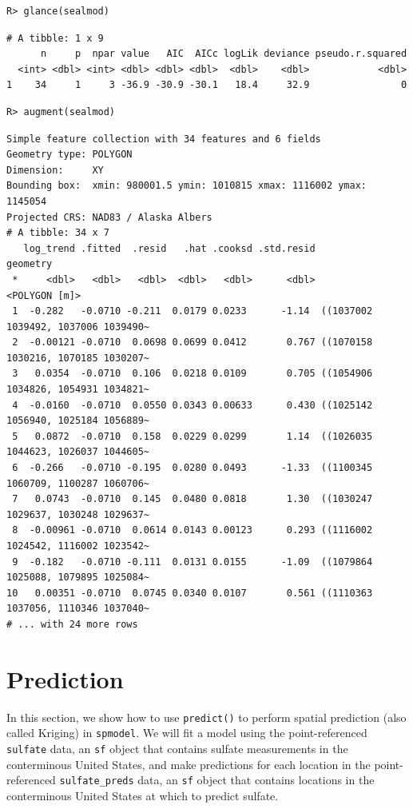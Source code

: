 \documentclass[10pt,letterpaper]{article}
\begin{document}
\begin{verbatim}
R> glance(sealmod)
\end{verbatim}

\begin{verbatim}
# A tibble: 1 x 9
      n     p  npar value   AIC  AICc logLik deviance pseudo.r.squared
  <int> <dbl> <int> <dbl> <dbl> <dbl>  <dbl>    <dbl>            <dbl>
1    34     1     3 -36.9 -30.9 -30.1   18.4     32.9                0
\end{verbatim}

\begin{verbatim}
R> augment(sealmod)
\end{verbatim}

\begin{verbatim}
Simple feature collection with 34 features and 6 fields
Geometry type: POLYGON
Dimension:     XY
Bounding box:  xmin: 980001.5 ymin: 1010815 xmax: 1116002 ymax: 1145054
Projected CRS: NAD83 / Alaska Albers
# A tibble: 34 x 7
   log_trend .fitted  .resid   .hat .cooksd .std.resid                            geometry
 *     <dbl>   <dbl>   <dbl>  <dbl>   <dbl>      <dbl>                       <POLYGON [m]>
 1  -0.282   -0.0710 -0.211  0.0179 0.0233      -1.14  ((1037002 1039492, 1037006 1039490~
 2  -0.00121 -0.0710  0.0698 0.0699 0.0412       0.767 ((1070158 1030216, 1070185 1030207~
 3   0.0354  -0.0710  0.106  0.0218 0.0109       0.705 ((1054906 1034826, 1054931 1034821~
 4  -0.0160  -0.0710  0.0550 0.0343 0.00633      0.430 ((1025142 1056940, 1025184 1056889~
 5   0.0872  -0.0710  0.158  0.0229 0.0299       1.14  ((1026035 1044623, 1026037 1044605~
 6  -0.266   -0.0710 -0.195  0.0280 0.0493      -1.33  ((1100345 1060709, 1100287 1060706~
 7   0.0743  -0.0710  0.145  0.0480 0.0818       1.30  ((1030247 1029637, 1030248 1029637~
 8  -0.00961 -0.0710  0.0614 0.0143 0.00123      0.293 ((1116002 1024542, 1116002 1023542~
 9  -0.182   -0.0710 -0.111  0.0131 0.0155      -1.09  ((1079864 1025088, 1079895 1025084~
10   0.00351 -0.0710  0.0745 0.0340 0.0107       0.561 ((1110363 1037056, 1110346 1037040~
# ... with 24 more rows
\end{verbatim}

\hypertarget{sec:prediction}{%
\section{Prediction}\label{sec:prediction}}

In this section, we show how to use \texttt{predict()} to perform
spatial prediction (also called Kriging) in \texttt{spmodel}. We will
fit a model using the point-referenced \texttt{sulfate} data, an
\texttt{sf} object that contains sulfate measurements in the
conterminous United States, and make predictions for each location in
the point-referenced \texttt{sulfate\_preds} data, an \texttt{sf} object
that contains locations in the conterminous United States at which to
predict sulfate.
\end{document}
